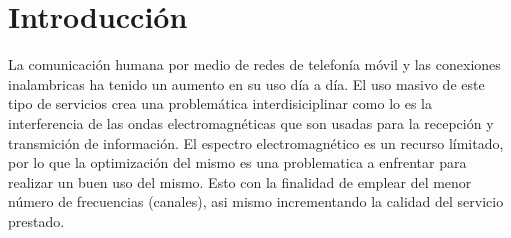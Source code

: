 \section{Introducción}

La comunicación humana por medio de redes de telefonía móvil y las conexiones inalambricas ha tenido un aumento en su uso día a día.\cite{Inzaurralde_2014} El uso masivo de este tipo de servicios crea una problemática interdisiciplinar como lo es la interferencia de las ondas electromagnéticas que son usadas para la recepción y transmición de información. El espectro electromagnético es un recurso límitado, por lo que la optimización del mismo es una problematica a enfrentar para realizar un buen uso del mismo. Esto con la finalidad de emplear del menor número de frecuencias (canales), asi mismo incrementando la calidad del servicio prestado.